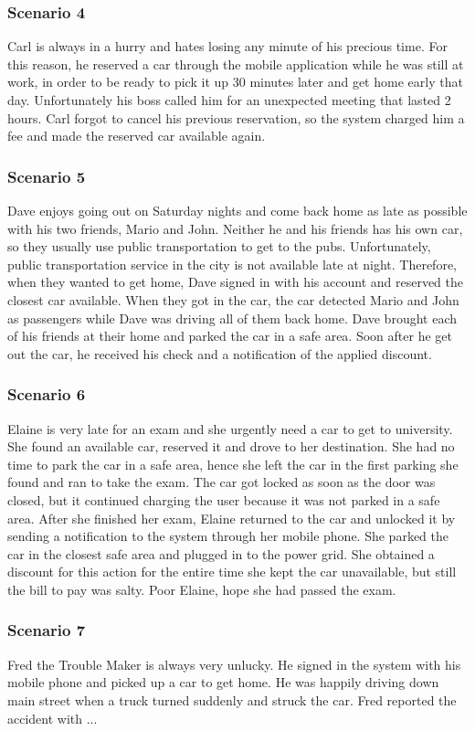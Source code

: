 \subsubsection{Scenario 4}
Carl is always in a hurry and hates losing any minute of his precious time. For this reason, he reserved a car through the mobile application while he was still at work, in order to be ready to pick it up 30 minutes later and get home early that day. Unfortunately his boss called him for an unexpected meeting that lasted 2 hours. Carl forgot to cancel his previous reservation, so the system charged him a fee and made the reserved car available again.

\subsubsection{Scenario 5}
Dave enjoys going out on Saturday nights and come back home as late as possible with his two friends, Mario and John.  Neither he and his friends has his own car, so they usually use public transportation to get to the pubs. Unfortunately, public transportation service in the city is not available late at night. Therefore, when they wanted to get home, Dave signed in with his account and reserved the closest car available. When they got in the car, the car detected Mario and John as passengers while Dave was driving all of them back home. Dave brought each of his friends at their home and parked the car in a safe area. Soon after he get out the car, he received his check and a notification of the applied discount.

\subsubsection{Scenario 6}
Elaine is very late for an exam and she urgently need a car to get to university. She found an available car, reserved it and drove to her destination. She had no time to park the car in a safe area, hence she left the car in the first parking she found and ran to take the exam. The car got locked as soon as the door was closed, but it continued charging the user because it was not parked in a safe area. After she finished her exam, Elaine returned to the car and unlocked it by sending a notification to the system through her mobile phone. She parked the car in the closest safe area and plugged in to the power grid. She obtained a discount for this action for the entire time she kept the car unavailable, but still the bill to pay was salty. Poor Elaine, hope she had passed the exam.

\subsubsection{Scenario 7}
Fred the Trouble Maker is always very unlucky. He signed in the system with his mobile phone and picked up a car to get home. He was happily driving down main street when a truck turned suddenly and struck the car. Fred reported the accident with ...
